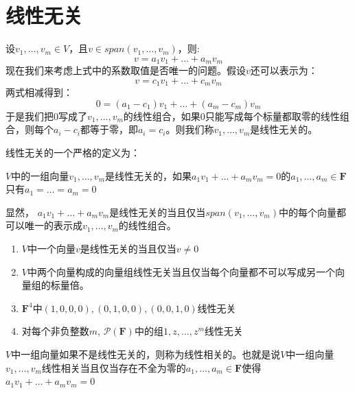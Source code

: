 \documentclass[10pt,a4paper,UTF8]{article}
\begin{document}
\section{线性无关}
\label{sec:orgheadline2}


设\(v_{1},\ldots ,v_{m}\in V\)，且\(v\in span(v_{1},\ldots ,v_{m})\)，则:\[v = a_{1}v_{1} + \ldots + a_{m}v_{m}\]现在我们来考虑上式中的系数取值是否唯一的问题。假设\(v\)还可以表示为：\[v = c_{1}v_{1} + \ldots + c_{m}v_{m}\]两式相减得到：\[0 = (a_{1}-c_{1})v_{1} + \ldots + (a_{m}-c_{m})v_{m}\]于是我们把\(0\)写成了\(v_{1},\ldots ,v_{m}\)的线性组合，如果\(0\)只能写成每个标量都取零的线性组合，则每个\(a_{i}-c_{i}\)都等于零，即\(a_{i} = c_{i}\)。则我们称\(v_{1},\ldots ,v_{m}\)是线性无关的。

线性无关的一个严格的定义为：
\begin{definition}[线性无关]
\(V\)中的一组向量\(v_{1},\ldots ,v_{m}\)是线性无关的，如果\(a_{1}v_{1} + \ldots + a_{m}v_{m} =0\)的\(a_{1},\ldots ,a_{m}\in \mathbf{F}\)只有\(a_{1} = \ldots = a_{m} = 0\)
\end{definition}

显然， \(a_{1}v_{1} + \ldots + a_{m}v_{m}\)是线性无关的当且仅当\(span(v_{1},\ldots ,v_{m})\)中的每个向量都可以唯一的表示成\(v_{1},\ldots ,v_{m}\)的线性组合。

\begin{instance}
\begin{enumerate}
\item \(V\)中一个向量\(v\)是线性无关的当且仅当\(v\neq 0\)
\item \(V\)中两个向量构成的向量组线性无关当且仅当每个向量都不可以写成另一个向量组的标量倍。
\item \(\mathbf{F}^{4}\)中\((1,0,0,0),(0,1,0,0),(0,0,1,0)\)线性无关
\item 对每个非负整数\(m\), \(\mathcal{P}(\mathbf{F})\)中的组\(1,z,\ldots ,z^{m}\)线性无关
\end{enumerate}
\end{instance}

\begin{definition}[线性相关]
\(V\)中一组向量如果不是线性无关的，则称为线性相关的。也就是说\(V\)中一组向量\(v_{1},\ldots ,v_{m}\)线性相关当且仅当存在不全为零的\(a_{1},\ldots ,a_{m} \in \mathbf{F}\)使得 \(a_{1}v_{1} + \ldots + a_{m}v_{m} = 0\)
\end{definition}
\end{document}
